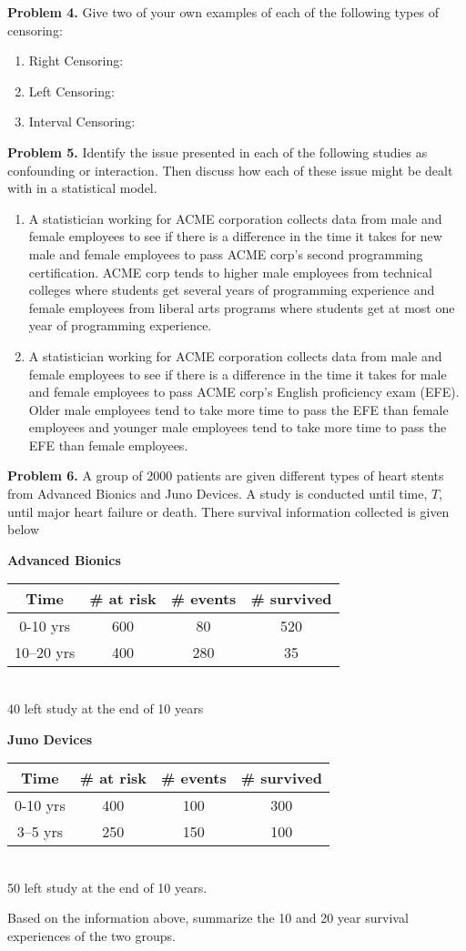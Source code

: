 \documentclass[12pt]{article}
\begin{document}
\textbf{Problem 4.} 
Give two of your own examples of each of the following types of censoring:
\begin{enumerate}
\item Right Censoring: 
\item Left Censoring:
\item Interval Censoring: 
\end{enumerate} 

\textbf{Problem 5.}
Identify the issue presented in each of the following studies as confounding or interaction. Then discuss how each of these issue might be dealt with in a statistical model. 
\begin{enumerate}
\item A statistician working for ACME corporation collects data from male and female employees to see if there is a difference in the time it takes for new male and female employees to pass ACME corp's second programming certification. ACME corp tends to higher male employees from technical colleges where students get several years of programming experience and female employees from liberal arts programs where students get at most one year of programming experience. 
\item  A statistician working for ACME corporation collects data from male and female employees to see if there is a difference in the time it takes for male and female employees to pass ACME corp's English proficiency exam (EFE). Older male employees tend to take more time to pass the EFE than female employees and younger male employees tend to take more time to pass the EFE than female employees. 
\end{enumerate} 

\textbf{Problem 6.} 
A group of 2000 patients are given different types of heart stents from Advanced Bionics and Juno Devices. A study is conducted until time, $T$, until major heart failure or death. There survival information collected is given below 
\begin{center}
\textbf{Advanced Bionics}
\begin{tabular}{ c c c c }
 Time & \# at risk & \# events & \# survived \\ \hline
 0-10 yrs & 600 & 80 & 520 \\
 10–20 yrs &  400 & 280 & 35
\end{tabular} \\
40 left study at the end of 10 years
\end{center}
\begin{center}
\textbf{Juno Devices}
\begin{tabular}{ c c c c }
 Time & \# at risk & \# events & \# survived \\ \hline
 0-10 yrs & 400 & 100 & 300 \\
 3–5 yrs &  250 & 150 & 100
\end{tabular} \\
50 left study at the end of 10 years.
\end{center}
Based on the information above, summarize the 10 and 20 year survival experiences of the two groups.   
\end{document}
